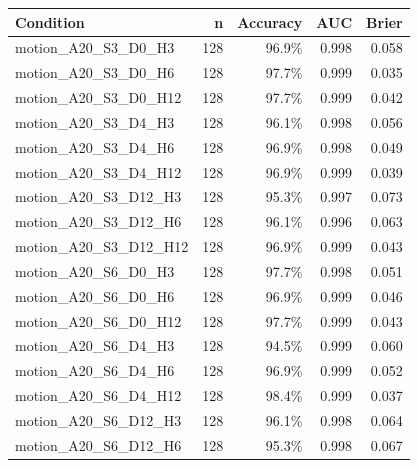 \documentclass[11pt]{article}
\begin{document}
\small\begin{longtable}{p{}rrrr}\toprule Condition & n & Accuracy & AUC & Brier\\\midrule\endhead
motion\_\allowbreak{}A20\_\allowbreak{}S3\_\allowbreak{}D0\_\allowbreak{}H3 & 128 & 96.9\% & 0.998 & 0.058\\
motion\_\allowbreak{}A20\_\allowbreak{}S3\_\allowbreak{}D0\_\allowbreak{}H6 & 128 & 97.7\% & 0.999 & 0.035\\
motion\_\allowbreak{}A20\_\allowbreak{}S3\_\allowbreak{}D0\_\allowbreak{}H12 & 128 & 97.7\% & 0.999 & 0.042\\
motion\_\allowbreak{}A20\_\allowbreak{}S3\_\allowbreak{}D4\_\allowbreak{}H3 & 128 & 96.1\% & 0.998 & 0.056\\
motion\_\allowbreak{}A20\_\allowbreak{}S3\_\allowbreak{}D4\_\allowbreak{}H6 & 128 & 96.9\% & 0.998 & 0.049\\
motion\_\allowbreak{}A20\_\allowbreak{}S3\_\allowbreak{}D4\_\allowbreak{}H12 & 128 & 96.9\% & 0.999 & 0.039\\
motion\_\allowbreak{}A20\_\allowbreak{}S3\_\allowbreak{}D12\_\allowbreak{}H3 & 128 & 95.3\% & 0.997 & 0.073\\
motion\_\allowbreak{}A20\_\allowbreak{}S3\_\allowbreak{}D12\_\allowbreak{}H6 & 128 & 96.1\% & 0.996 & 0.063\\
motion\_\allowbreak{}A20\_\allowbreak{}S3\_\allowbreak{}D12\_\allowbreak{}H12 & 128 & 96.9\% & 0.999 & 0.043\\
motion\_\allowbreak{}A20\_\allowbreak{}S6\_\allowbreak{}D0\_\allowbreak{}H3 & 128 & 97.7\% & 0.998 & 0.051\\
motion\_\allowbreak{}A20\_\allowbreak{}S6\_\allowbreak{}D0\_\allowbreak{}H6 & 128 & 96.9\% & 0.999 & 0.046\\
motion\_\allowbreak{}A20\_\allowbreak{}S6\_\allowbreak{}D0\_\allowbreak{}H12 & 128 & 97.7\% & 0.999 & 0.043\\
motion\_\allowbreak{}A20\_\allowbreak{}S6\_\allowbreak{}D4\_\allowbreak{}H3 & 128 & 94.5\% & 0.999 & 0.060\\
motion\_\allowbreak{}A20\_\allowbreak{}S6\_\allowbreak{}D4\_\allowbreak{}H6 & 128 & 96.9\% & 0.999 & 0.052\\
motion\_\allowbreak{}A20\_\allowbreak{}S6\_\allowbreak{}D4\_\allowbreak{}H12 & 128 & 98.4\% & 0.999 & 0.037\\
motion\_\allowbreak{}A20\_\allowbreak{}S6\_\allowbreak{}D12\_\allowbreak{}H3 & 128 & 96.1\% & 0.998 & 0.064\\
motion\_\allowbreak{}A20\_\allowbreak{}S6\_\allowbreak{}D12\_\allowbreak{}H6 & 128 & 95.3\% & 0.998 & 0.067\\

\end{longtable}
\end{document}
